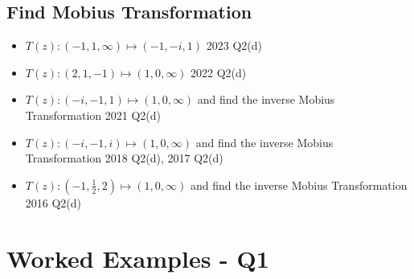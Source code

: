 \documentclass[a4paper, 8pt]{extarticle}
\begin{document}
\subsection{Find Mobius Transformation}
\begin{itemize}
    \item $T(z) : (-1, 1, \infty) \mapsto (-1, -i, 1)$ \hfill 2023 Q2(d)
    \item $T(z) : (2, 1, -1) \mapsto (1, 0, \infty)$    \hfill 2022 Q2(d)
    \item $T(z) : (-i, -1, 1) \mapsto (1, 0, \infty)$ and find the inverse Mobius Transformation \hfill 2021 Q2(d)
    \item $T(z) : (-i, -1, i) \mapsto (1, 0, \infty)$ and find the inverse Mobius Transformation \hfill 2018 Q2(d), 2017 Q2(d)
    \item $T(z) : (-1, \frac{1}{2}, 2) \mapsto (1, 0, \infty)$ and find the inverse Mobius Transformation \hfill 2016 Q2(d)
\end{itemize}

\pagebreak

\section{Worked Examples - Q1}
\end{document}
